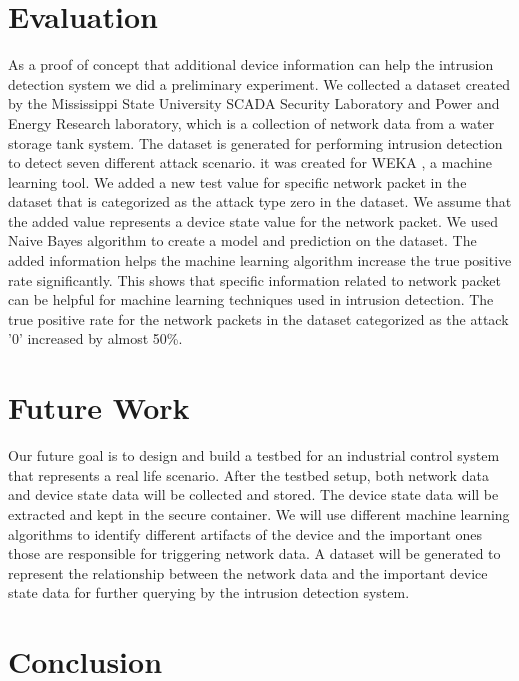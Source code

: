 \documentclass[conference]{IEEEtran}
\begin{document}
\section{Evaluation}
As a proof of concept that additional device information can help the intrusion detection system we did a preliminary experiment. We collected a dataset \cite{c7} created by the Mississippi State University SCADA Security Laboratory and Power and Energy Research laboratory, which is a collection of network data from a water storage tank system. The dataset is generated for performing intrusion detection to detect seven different attack scenario. it was created for WEKA \cite{c8}, a machine learning tool. We added a new test value for specific network packet in the dataset that is categorized as the attack type zero in the dataset. We assume that the added value represents a device state value for the network packet. We used Naive Bayes algorithm to create a model and prediction on the dataset. The added information helps the machine learning algorithm increase the true positive rate significantly. This shows that specific information related to network packet can be helpful for machine learning techniques used in intrusion detection. The true positive rate for the network packets in the dataset categorized as the attack '0' increased by almost 50\%.
\section{Future Work}
Our future goal is to design and build a testbed for an industrial control system that represents a real life scenario. After the testbed setup, both network data and device state data will be collected and stored. The device state data will be extracted and kept in the secure container. We will use different machine learning algorithms to identify different artifacts of the device and the important ones those are responsible for triggering network data. A dataset will be generated to represent the relationship between the network data and the important device state data for further querying by the intrusion detection system.
\section{Conclusion}
\end{document}
